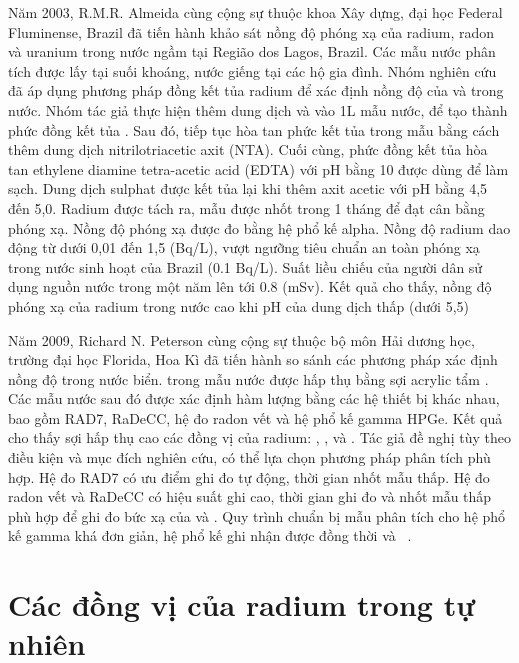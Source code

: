 Năm 2003, R.M.R. Almeida cùng cộng sự thuộc khoa Xây dựng, đại học Federal Fluminense, Brazil đã tiến hành khảo sát nồng độ phóng xạ của radium, radon và uranium trong nước ngầm tại Região dos Lagos, Brazil. Các mẫu nước phân tích được lấy tại suối khoáng, nước giếng tại các hộ gia đình. Nhóm nghiên cứu đã áp dụng phương pháp đồng kết tủa radium để xác định nồng độ của  và  trong nước. Nhóm tác giả thực hiện thêm dung dịch  và  vào 1L mẫu nước, để tạo thành phức đồng kết tủa . Sau đó, tiếp tục hòa tan phức kết tủa trong mẫu bằng cách thêm dung dịch nitrilotriacetic axit (NTA). Cuối cùng, phức đồng kết tủa hòa tan ethylene diamine tetra-acetic acid (EDTA) với pH bằng 10 được dùng để làm sạch. Dung dịch sulphat được kết tủa lại khi thêm axit acetic với pH bằng 4,5 đến 5,0. Radium được tách ra, mẫu được nhốt trong 1 tháng để đạt cân bằng phóng xạ. Nồng độ phóng xạ được đo bằng hệ phổ kế alpha. Nồng độ radium dao động từ dưới 0,01 đến 1,5 (Bq/L), vượt ngưỡng tiêu chuẩn an toàn phóng xạ trong nước sinh hoạt của Brazil (0.1 Bq/L). Suất liều chiếu của người dân sử dụng nguồn nước trong một năm lên tới 0.8 (mSv). Kết quả cho thấy, nồng độ phóng xạ của radium trong nước cao khi pH của dung dịch thấp (dưới 5,5) ~\cite{MnO2:RMRAlmeida}

Năm 2009, Richard N. Peterson cùng cộng sự thuộc bộ môn Hải dương học, trường đại học Florida, Hoa Kì đã tiến hành so sánh các phương pháp xác định nồng độ  trong nước biển.  trong mẫu nước được hấp thụ bằng sợi acrylic tẩm . Các mẫu nước sau đó được xác định hàm lượng  bằng các hệ thiết bị khác nhau, bao gồm RAD7, RaDeCC, hệ đo radon vết và hệ phổ kế gamma HPGe. Kết quả cho thấy sợi  hấp thụ cao các đồng vị của radium: , ,  và . Tác giả đề nghị tùy theo điều kiện và mục đích nghiên cứu, có thể lựa chọn phương pháp phân tích phù hợp. Hệ đo RAD7 có ưu điểm ghi đo tự động, thời gian nhốt mẫu thấp. Hệ đo radon vết và RaDeCC có hiệu suất ghi cao, thời gian ghi đo và nhốt mẫu thấp phù hợp để ghi đo bức xạ của  và . Quy trình chuẩn bị mẫu phân tích cho hệ phổ kế gamma khá đơn giản, hệ phổ kế ghi nhận được đồng thời  và  ~\cite{MnO2:RichardNPeterson}.

\section{Các đồng vị của radium trong tự nhiên}

